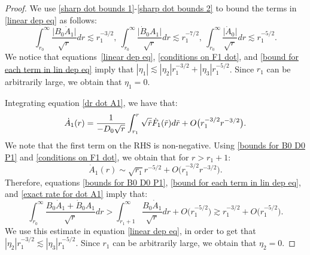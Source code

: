 \documentclass[11pt]{article}
\numberwithin{equation}{section}
\begin{document}
\begin{proof}
    We use \eqref{sharp dot bounds 1}-\eqref{sharp dot bounds 2} to bound the terms in \eqref{linear dep eq} as follows:
    \begin{equation}\label{bound for each term in lin dep eq}
        \int_{r_0}^{\infty}\frac{\big|B_0\dot{A}_1\big|}{\sqrt{r}}dr\lesssim r_1^{-3/2},\ \int_{r_0}^{\infty}\frac{\big|\dot{B}_0A_1\big|}{\sqrt{r}}dr\lesssim r_1^{-7/2},\ \int_{r_0}^{\infty}\frac{\big|\dot{A}_0\big|}{\sqrt{r}}dr\lesssim r_1^{-5/2}.
    \end{equation}
    We notice that equations~\eqref{linear dep eq}, \eqref{conditions on F1 dot}, and \eqref{bound for each term in lin dep eq} imply that $|\eta_1|\lesssim|\eta_2|r_1^{-3/2}+|\eta_3|r_1^{-5/2}$. Since $r_1$ can be arbitrarily large, we obtain that $\eta_1=0.$ 

    Integrating equation \eqref{dr dot A1}, we have that:
    \[\dot{A}_1(r)=\frac{1}{-D_0\sqrt{r}}\int_{r_1}^{r}\sqrt{\Tilde{r}}\dot{F}_1(\Tilde{r})d\Tilde{r}+O\big(r_1^{-3/2}r^{-3/2}\big).\]
    We note that the first term on the RHS is non-negative. Using \eqref{bounds for B0 D0 P1} and \eqref{conditions on F1 dot}, we obtain that for $r>r_1+1$:
    \begin{equation}\label{exact rate for dot A1}
        \dot{A}_1(r)\sim\sqrt{r_1}r^{-5/2}+O\big(r_1^{-3/2}r^{-3/2}\big).
    \end{equation}
    Therefore, equations \eqref{bounds for B0 D0 P1}, \eqref{bound for each term in lin dep eq}, and \eqref{exact rate for dot A1} imply that:
    \[\int_{r_0}^{\infty}\frac{B_0\dot{A}_1+\dot{B}_0A_1}{\sqrt{r}}dr>\int_{r_1+1}^{\infty}\frac{B_0\dot{A}_1}{\sqrt{r}}dr+O\big(r_1^{-5/2}\big)\gtrsim r_1^{-3/2}+O\big(r_1^{-5/2}\big).\]
    We use this estimate in equation \eqref{linear dep eq}, in order to get that $|\eta_2|r_1^{-3/2}\lesssim|\eta_3|r_1^{-5/2}$. Since $r_1$ can be arbitrarily large, we obtain that $\eta_2=0.$ 


\end{proof}
\end{document}
